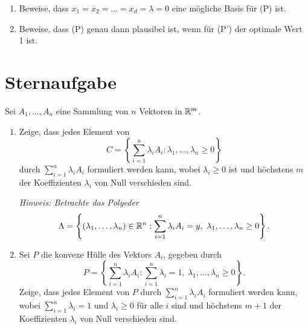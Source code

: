 \documentclass{uebung_cs}
\begin{document}
\begin{aufgabe}
	\begin{enumerate}
		\item Beweise, dass $x_1 = x_2 = \dots = x_d = \lambda = 0$ eine mögliche Basis für (P) ist.
		\item Beweise, dass (P) genau dann plausibel ist, wenn für (P') der optimale Wert 1 ist.
	\end{enumerate}
\end{aufgabe}


\section*{Sternaufgabe}

\begin{aufgabe}
%
	Sei $A_1,\dots , A_n$ eine Sammlung von $n$ Vektoren in $\mathbb{R}^m$.
	\begin{enumerate}
		\item Zeige, dass jedes Element von 
			\[
				C=\left\{\sum_{i=1}^n \lambda_i A_i : \lambda_1, \dots , \lambda_n\geq 0\right\}
			\]
			durch $\sum_{i=1}^n \lambda_i A_i$ formuliert werden kann, wobei $\lambda_i\geq 0$ ist und höchstens $m$ der Koeffizienten $\lambda_i$ von Null verschieden sind. 

			\textit{Hinweis: Betrachte das Polyeder
			\[
				\Lambda=\left\{(\lambda_1, \dots , \lambda_n)\in \mathbb{R}^n : \sum_{i=1}^n\lambda_i A_i = y,\ \lambda_1, \dots , \lambda_n\geq 0\right\}.
			\]}
		\item Sei $P$ die konvexe Hülle des Vektors $A_i$, gegeben durch
			\[
				P=\left\{\sum_{i=1}^n \lambda_i A_i : \sum_{i=1}^n\lambda_i=1,\ \lambda_1, \dots , \lambda_n\geq 0\right\}.
			\]
			Zeige, dass jedes Element von $P$ durch $\sum_{i=1}^n \lambda_i A_i$ formuliert werden kann, wobei $\sum_{i=1}^n \lambda_i=1$ und $\lambda_i\geq 0$ für alle $i$ sind und höchstens $m+1$ der Koeffizienten $\lambda_i$ von Null verschieden sind.
	\end{enumerate}
\end{aufgabe}
\end{document}
